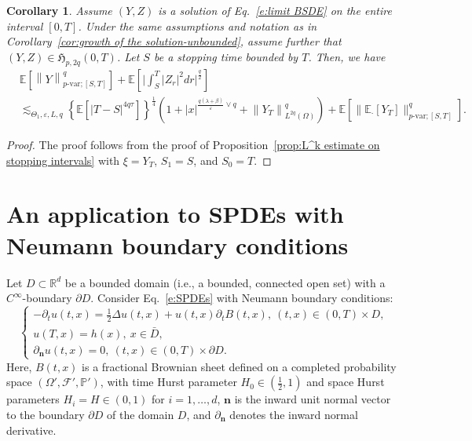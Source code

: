 \documentclass[11pt,reqno]{amsart}
\newtheorem{corollary}{Corollary}[section]
\numberwithin{equation}{section}
\begin{document}
 
\begin{corollary}\label{cor:L^k estimate on stopping intervals'}
Assume $(Y,Z)$ is a solution of Eq.~\eqref{e:limit BSDE} on the entire interval $[0,T]$. Under the same assumptions and notation as in Corollary~\ref{cor:growth of the solution-unbounded}, assume further that $(Y,Z)\in \mathfrak{H}_{p,2q}(0,T)$. Let $S$ be a stopping time bounded by $T$. Then, we have
\begin{equation*}
\begin{aligned}
&\mathbb{E}\left[\left\|Y\right\|_{p\text{-}\mathrm{var};[S,T]}^{q}\right] + \mathbb{E}\left[\Big|\int_{S}^{T}|Z_{r}|^{2}dr\Big|^{\frac{q}{2}}\right]\\
&\lesssim_{\Theta_{1},\varepsilon,L,q}\left\{\mathbb{E}\left[|T-S|^{4q\tau}\right]\right\}^{\frac{1}{4}}\left(1 + |x|^{\frac{q(\lambda+\beta)}{\varepsilon}\vee q} + \left\|Y_{T}\right\|^{q}_{L^{2q}(\Omega)}\right) + \mathbb{E}\left[\|\mathbb{E}_{\cdot}[Y_{T}]\|^{q}_{p\text{-}\mathrm{var};[S,T]}\right].
\end{aligned}
\end{equation*}
\end{corollary}
\begin{proof}
The proof follows from the proof of Proposition~\ref{prop:L^k estimate on stopping intervals} with $\xi = Y_{T}$, $S_1 = S$, and $S_0=T$.
\end{proof}


\section{An application to SPDEs with Neumann boundary conditions}\label{sec:reflecting Feynman-Kac functional}

Let $D\subset\mathbb{R}^{d}$ be a bounded domain (i.e., a bounded, connected open set) with a $C^{\infty}$-boundary $\partial D$. Consider Eq.~\eqref{e:SPDEs} with Neumann boundary conditions:
\begin{equation}\label{e:SPDE Neumann}
\begin{cases}
\displaystyle-\partial_{t}u(t,x) = \frac{1}{2}\Delta u(t,x) + u(t,x)\partial_{t}B(t,x),\ (t,x)\in(0,T)\times D,\\[5pt]
\displaystyle u(T,x) = h(x),\ x\in\bar{D},\\[5pt] \displaystyle \partial_{\mathbf{n}}u(t,x) = 0,\ (t,x)\in (0,T)\times \partial D.
\end{cases}
\end{equation}
Here, $B(t,x)$ is a fractional Brownian sheet defined on a completed probability space $(\Omega',\mathcal{F}',\mathbb{P}')$,
with time Hurst parameter $H_0\in(\frac12, 1)$ and space Hurst parameters $H_i=H\in(0,1)$ for  $i=1, \dots, d$, $\mathbf{n}$ is the inward unit normal vector to the boundary $\partial D$ of  the domain $D$, and $\partial_{\mathbf{n}}$ denotes the inward normal derivative. 
\end{document}
